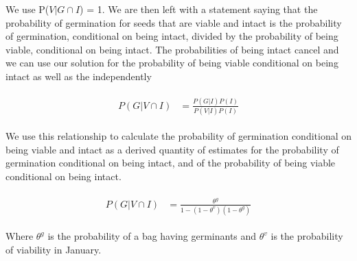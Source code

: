 \documentclass[12pt, oneside]{article}   	%
\begin{document}
We use P($V|G \cap I$) = 1. We are then left with a statement saying that the probability of germination for seeds that are viable and intact is the probability of germination, conditional on being intact, divided by the probability of being viable, conditional on being intact. The probabilities of being intact cancel and we can use our solution for the probability of being viable conditional on being intact as well as the independently  
 
    \begin{align}
\begin{split}
	P(G | V \cap I)  &= \frac{ P(G | I)  P(I)}{P(V | I)  P(I) }
  \end{split}
\end{align}

We use this relationship to calculate the probability of germination conditional on being viable and intact as a derived quantity of estimates for the probability of germination conditional on being intact, and of the probability of being viable conditional on being intact. 

    \begin{align}
\begin{split}
	P(G | V \cap I)  &= \frac{ \theta^g }{ 1-(1-\theta^v)(1-\theta^g)}
  \end{split}
\end{align}

Where $\theta^g$ is the probability of a bag having germinants and $\theta^v$ is the probability of viability in January.  
\end{document}
